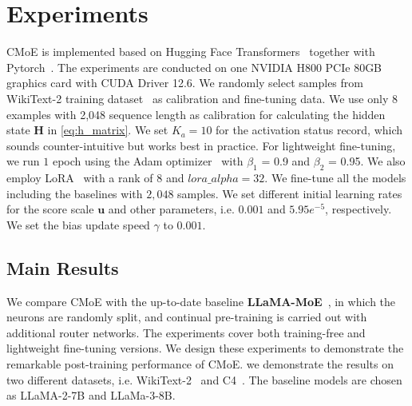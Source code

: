\section{Experiments}

\iffalse
Here, we first describe the experimental setting for CMoE implementation.
We then present the main comparison results from perplexity to zero-shot task results, including the model without fine-tuning and with fine-tuning on modest data. Finally, we conduct ablation studies for CMoE.

\subsection{Experimental Setting}
\fi

CMoE is implemented based on Hugging Face Transformers~\cite{wolf2019huggingface} together with Pytorch~\cite{paszke2019pytorch}.
The experiments are conducted on one NVIDIA H800 PCIe 80GB graphics card with CUDA Driver 12.6.
We randomly select samples from WikiText-2 training dataset~\cite{merity2016pointer} as calibration and fine-tuning data.
We use only 8 examples with 2,048 sequence length as calibration for calculating the hidden state $\mathbf{H}$ in \eqref{eq:h_matrix}.
We set $K_a = 10$ for the activation status record, which sounds counter-intuitive but works best in practice.
For lightweight fine-tuning, we run $1$ epoch using the Adam optimizer~\cite{kingma2014adam} with $\beta_1$ = 0.9 and $\beta_2$ = 0.95.
We also employ LoRA~\cite{hu2021lora} with a rank of 8 and $lora\_alpha = 32$.
We fine-tune all the models including the baselines with $2,048$ samples.
We set different initial learning rates for the score scale $\mathbf{u}$ and other parameters, i.e. $0.001$ and $5.95e^{-5}$, respectively.
We set the bias update speed $\gamma$ to $0.001$.


\subsection{Main Results}

We compare CMoE with the up-to-date baseline \textbf{LLaMA-MoE}~\cite{llama-moe}, in which the neurons are randomly split, and continual pre-training is carried out with additional router networks. The experiments cover both training-free and lightweight fine-tuning versions. We design these experiments to demonstrate the remarkable post-training performance of CMoE. we demonstrate the results on two different datasets, i.e. WikiText-2~\cite{merity2016pointer} and C4~\cite{raffel2020exploring}. The baseline models are chosen as LLaMA-2-7B and LLaMa-3-8B. 



